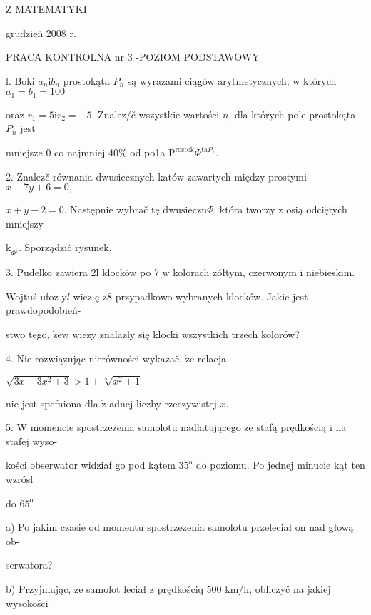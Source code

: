 \documentclass[a4paper,12pt]{article}
\begin{document}
Z MATEMATYKI

grudzień 2008 r.

PRACA KONTROLNA nr 3 -POZIOM PODSTAWOWY

l. Boki $a_{n}\mathrm{i}b_{n}$ prostokąta $P_{n}$ są wyrazami ciągów arytmetycznych, $\mathrm{w}$ których $a_{1}=b_{1}=100$

oraz $r_{1}=5\mathrm{i}r_{2}=-5$. Znalez/č wszystkie wartości $n$, dla których pole prostokąta $P_{n}$ jest

mniejsze $0$ co najmniej 40\% od po1a $\mathrm{P}^{\mathrm{r}\mathrm{o}\mathrm{s}\mathrm{t}\mathrm{o}\mathrm{k}}\Phi^{\mathrm{t}\mathrm{a}P_{1}}.$

2. Znalez$\acute{}$č równania dwusiecznych katów zawartych między prostymi $x-7y+6 = 0,$

$x+y-2=0$. Następnie wybrač tę $\mathrm{d}\mathrm{w}\mathrm{u}\mathrm{s}\mathrm{i}\mathrm{e}\mathrm{c}\mathrm{z}\mathrm{n}\Phi$, która tworzy $\mathrm{z}$ osią odciętych mniejszy

$\mathrm{k}_{\Phi^{\mathrm{t}}}$. Sporządzič rysunek.

3. Pudelko zawiera 2l klocków po 7 $\mathrm{w}$ kolorach zółtym, czerwonym $\mathrm{i}$ niebieskim.

Wojtuś ufoz $\mathrm{y}l$ wiez$\cdot$ę $\mathrm{z}8$ przypadkowo wybranych klocków. Jakie jest prawdopodobień-

stwo tego, $\dot{\mathrm{z}}\mathrm{e}\mathrm{w}$ wiezy znalazly się klocki wszystkich trzech kolorów?

4. Nie rozwiązując nierówności wykazač, $\dot{\mathrm{z}}\mathrm{e}$ relacja

$\sqrt{3x-3x^{2}+3}>1+\sqrt[5]{x^{2}+1}$

nie jest spefniona dla $\dot{\mathrm{z}}$ adnej liczby rzeczywistej $x.$

5. $\mathrm{W}$ momencie spostrzezenia samolotu nadlatującego ze stafą prędkością $\mathrm{i}$ na stafej wyso-

kości obserwator widziaf go pod kątem $35^{\mathrm{o}}$ do poziomu. Po jednej minucie kąt ten wzrósl

do $65^{\mathrm{o}}$

a) Po jakim czasie od momentu spostrzezenia samolotu przeleciał on nad głową ob-

serwatora?

b) Przyjmując, $\dot{\mathrm{z}}\mathrm{e}$ samolot leciał $\mathrm{z}$ prędkościq 500 $\mathrm{k}\mathrm{m}/\mathrm{h}$, obliczyč na jakiej wysokości
\end{document}
